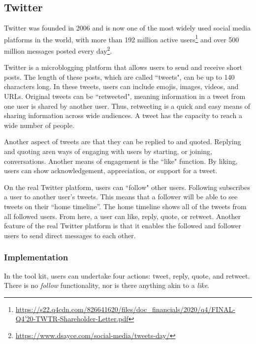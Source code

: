 \subsection{Twitter}
Twitter was founded in 2006 and is now one of the most widely used social media platforms in the world, with more than 192 million active users\footnote{\href{https://s22.q4cdn.com/826641620/files/doc_financials/2020/q4/FINAL-Q4'20-TWTR-Shareholder-Letter.pdf}{https://s22.q4cdn.com/826641620/files/doc\_financials/2020/q4/FINAL-Q4'20-TWTR-Shareholder-Letter.pdf} } and over 500 million messages posted every day\footnote{\href{https://www.dsayce.com/social-media/tweets-day/}{https://www.dsayce.com/social-media/tweets-day/} }.
\par Twitter is a microblogging platform that allows users to send and receive short posts. 
The length of these posts, which are called ``tweets", can be up to 140 characters long. In these tweets, users can include emojis, images, videos, and URLs. 
Original tweets can be ``retweeted", meaning information in a tweet from one user is shared by another user. 
Thus, retweeting is a quick and easy means of sharing information across wide audiences. 
A tweet has the capacity to reach a wide number of people. 
\par Another aspect of tweets are that they can be replied to and quoted. Replying and quoting aren ways of engaging with users by starting, or joining, conversations. 
Another means of engagement is the ``like" function. By liking, users can show acknowledgement, appreciation, or support for a tweet.
\par On the real Twitter platform, users can ``follow" other users. Following subscribes a user to another user's tweets. This means that a follower will be able to see tweets on their ``home timeline''. The home timeline shows all of the tweets from all followed users. From here, a user can like, reply, quote, or retweet. Another feature of the real Twitter platform is that it enables the followed and follower users to send direct messages to each other. 

\subsubsection {\rhpc Implementation}
\par In the \rhpc tool kit, users can undertake four actions: tweet, reply, quote, and retweet. There is no \textit{follow} functionality, nor is there anything akin to a \textit{like}.


